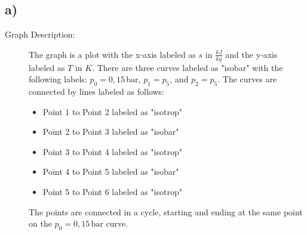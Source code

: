 

\subsection*{a)}

\begin{description}
    \item[Graph Description:] The graph is a plot with the x-axis labeled as $s$ in $\frac{kJ}{kg}$ and the y-axis labeled as $T$ in $K$. There are three curves labeled as "isobar" with the following labels: $p_0 = 0,15 \, \text{bar}$, $p_1 = p_5$, and $p_2 = p_5$. The curves are connected by lines labeled as follows:
    \begin{itemize}
        \item Point 1 to Point 2 labeled as "isotrop"
        \item Point 2 to Point 3 labeled as "isobar"
        \item Point 3 to Point 4 labeled as "isotrop"
        \item Point 4 to Point 5 labeled as "isobar"
        \item Point 5 to Point 6 labeled as "isotrop"
    \end{itemize}
    The points are connected in a cycle, starting and ending at the same point on the $p_0 = 0,15 \, \text{bar}$ curve.
\end{description}
